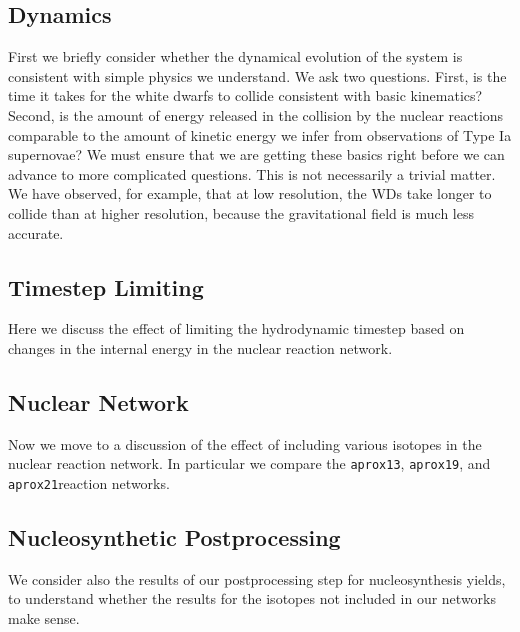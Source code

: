 \documentclass[twocolumn,numberedappendix]{../aastex6}
\newcommand{\aproxthirteen}{\texttt{aprox13}}
\newcommand{\aproxnineteen}{\texttt{aprox19}}
\newcommand{\aproxtwentyone}{\texttt{aprox21}}
\begin{document}
\subsection{Dynamics}
\label{sec:2D:dynamics}

First we briefly consider whether the dynamical evolution of the system
is consistent with simple physics we understand. We ask two questions.
First, is the time it takes for the white dwarfs to collide consistent with
basic kinematics? Second, is the amount of energy released in the
collision by the nuclear reactions comparable to the amount of kinetic
energy we infer from observations of Type Ia supernovae? We must ensure
that we are getting these basics right before we can advance to more
complicated questions. This is not necessarily a trivial matter. We have
observed, for example, that at low resolution, the WDs take longer to
collide than at higher resolution, because the gravitational field is
much less accurate.

\subsection{Timestep Limiting}
\label{sec:2D:timestep}

Here we discuss the effect of limiting the hydrodynamic timestep based on
changes in the internal energy in the nuclear reaction network.

\subsection{Nuclear Network}
\label{sec:2D:network}

Now we move to a discussion of the effect of including various isotopes
in the nuclear reaction network. In particular we compare the \aproxthirteen,
\aproxnineteen, and \aproxtwentyone reaction networks.

\subsection{Nucleosynthetic Postprocessing}
\label{sec:2D:postprocessing}

We consider also the results of our postprocessing step for nucleosynthesis
yields, to understand whether the results for the isotopes not included in
our networks make sense.



\end{document}
